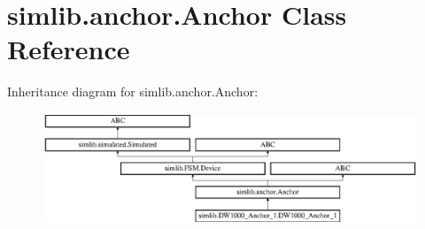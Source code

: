 \hypertarget{classsimlib_1_1anchor_1_1_anchor}{}\section{simlib.\+anchor.\+Anchor Class Reference}
\label{classsimlib_1_1anchor_1_1_anchor}
Inheritance diagram for simlib.\+anchor.\+Anchor\+:\begin{figure}[H]
\begin{center}
\leavevmode
\includegraphics[height=3.321471cm]{classsimlib_1_1anchor_1_1_anchor}
\end{center}
\end{figure}
